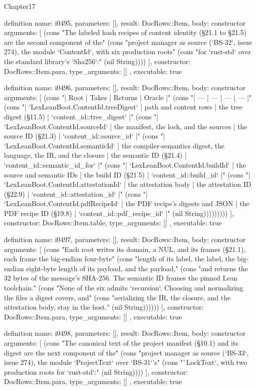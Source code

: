 \begin{lexlean}{Chapter17}
\begin{semanticmodule}
definition{
  name: i0495,
  parameters: [],
  result: DocRows::Item,
  body: constructor{
    arguments: [
      (cons "The labeled hash recipes of content identity (§21.1 to §21.5) are the second component of the" (cons "project manager as source (`BS-32`, issue 274), the module `ContentId`, with six production roots" (cons "for `rust-std` over the standard library's `Sha256`:" (nil String))))
    ],
    constructor: DocRows::Item.para,
    type_arguments: []
  },
  executable: true
}

definition{
  name: i0496,
  parameters: [],
  result: DocRows::Item,
  body: constructor{
    arguments: [
      (cons "| Root | Takes | Returns | Oracle |" (cons "| --- | --- | --- | --- |" (cons "| `LexLeanBoot.ContentId.treeDigest` | path and content rows | the tree digest (§11.5) | `content_id::tree_digest` |" (cons "| `LexLeanBoot.ContentId.sourceId` | the manifest, the lock, and the sources | the source ID (§21.3) | `content_id::source_id` |" (cons "| `LexLeanBoot.ContentId.semanticId` | the compiler-semantics digest, the language, the IR, and the closure | the semantic ID (§21.4) | `content_id::semantic_id_for` |" (cons "| `LexLeanBoot.ContentId.buildId` | the source and semantic IDs | the build ID (§21.5) | `content_id::build_id` |" (cons "| `LexLeanBoot.ContentId.attestationId` | the attestation body | the attestation ID (§22.9) | `content_id::attestation_id` |" (cons "| `LexLeanBoot.ContentId.pdfRecipeId` | the PDF recipe's digests and JSON | the PDF recipe ID (§19.8) | `content_id::pdf_recipe_id` |" (nil String)))))))))
    ],
    constructor: DocRows::Item.table,
    type_arguments: []
  },
  executable: true
}

definition{
  name: i0497,
  parameters: [],
  result: DocRows::Item,
  body: constructor{
    arguments: [
      (cons "Each root writes its domain, a NUL, and its frames (§21.1), each frame the big-endian four-byte" (cons "length of its label, the label, the big-endian eight-byte length of its payload, and the payload," (cons "and returns the 32 bytes of the message's SHA-256. The semantic ID frames the pinned Lean toolchain." (cons "None of the six admits `recursion`. Choosing and normalizing the files a digest covers, and" (cons "serializing the IR, the closure, and the attestation body, stay in the host." (nil String))))))
    ],
    constructor: DocRows::Item.para,
    type_arguments: []
  },
  executable: true
}

definition{
  name: i0498,
  parameters: [],
  result: DocRows::Item,
  body: constructor{
    arguments: [
      (cons "The canonical text of the project manifest (§10.1) and its digest are the next component of the" (cons "project manager as source (`BS-33`, issue 274), the module `ProjectText` over `BS-31`'s" (cons "`LockText`, with two production roots for `rust-std`:" (nil String))))
    ],
    constructor: DocRows::Item.para,
    type_arguments: []
  },
  executable: true
}


\end{semanticmodule}
\end{lexlean}
